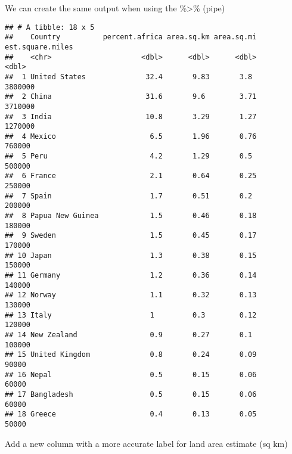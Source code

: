 \documentclass[
]{article}
\newenvironment{Shaded}{\begin{snugshade}}{\end{snugshade}}
\newcommand{\AttributeTok}[1]{\textcolor[rgb]{0.13,0.29,0.53}{#1}}
\newcommand{\DecValTok}[1]{\textcolor[rgb]{0.00,0.00,0.81}{#1}}
\newcommand{\FunctionTok}[1]{\textcolor[rgb]{0.13,0.29,0.53}{\textbf{#1}}}
\newcommand{\NormalTok}[1]{#1}
\newcommand{\SpecialCharTok}[1]{\textcolor[rgb]{0.81,0.36,0.00}{\textbf{#1}}}
\begin{document}
We can create the same output when using the \%\textgreater\% (pipe)

\begin{Shaded}
\end{Shaded}

\begin{verbatim}
## # A tibble: 18 x 5
##    Country          percent.africa area.sq.km area.sq.mi est.square.miles
##    <chr>                     <dbl>      <dbl>      <dbl>            <dbl>
##  1 United States              32.4       9.83       3.8           3800000
##  2 China                      31.6       9.6        3.71          3710000
##  3 India                      10.8       3.29       1.27          1270000
##  4 Mexico                      6.5       1.96       0.76           760000
##  5 Peru                        4.2       1.29       0.5            500000
##  6 France                      2.1       0.64       0.25           250000
##  7 Spain                       1.7       0.51       0.2            200000
##  8 Papua New Guinea            1.5       0.46       0.18           180000
##  9 Sweden                      1.5       0.45       0.17           170000
## 10 Japan                       1.3       0.38       0.15           150000
## 11 Germany                     1.2       0.36       0.14           140000
## 12 Norway                      1.1       0.32       0.13           130000
## 13 Italy                       1         0.3        0.12           120000
## 14 New Zealand                 0.9       0.27       0.1            100000
## 15 United Kingdom              0.8       0.24       0.09            90000
## 16 Nepal                       0.5       0.15       0.06            60000
## 17 Bangladesh                  0.5       0.15       0.06            60000
## 18 Greece                      0.4       0.13       0.05            50000
\end{verbatim}

Add a new column with a more accurate label for land area estimate (sq
km)

\begin{Shaded}
\end{Shaded}
\end{document}
